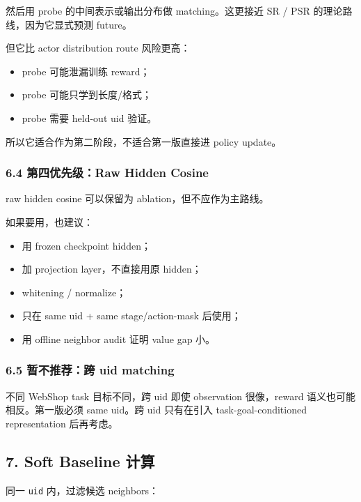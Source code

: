 \documentclass[
  10pt,
]{ctexart}
\providecommand{\tightlist}{%
  \setlength{\itemsep}{0pt}\setlength{\parskip}{0pt}}
\begin{document}
然后用 probe 的中间表示或输出分布做 matching。这更接近 SR / PSR
的理论路线，因为它显式预测 future。

但它比 actor distribution route 风险更高：

\begin{itemize}
\tightlist
\item
  probe 可能泄漏训练 reward；
\item
  probe 可能只学到长度/格式；
\item
  probe 需要 held-out uid 验证。
\end{itemize}

所以它适合作为第二阶段，不适合第一版直接进 policy update。

\subsubsection{6.4 第四优先级：Raw Hidden
Cosine}\label{ux7b2cux56dbux4f18ux5148ux7ea7raw-hidden-cosine}

raw hidden cosine 可以保留为 ablation，但不应作为主路线。

如果要用，也建议：

\begin{itemize}
\tightlist
\item
  用 frozen checkpoint hidden；
\item
  加 projection layer，不直接用原 hidden；
\item
  whitening / normalize；
\item
  只在 same uid + same stage/action-mask 后使用；
\item
  用 offline neighbor audit 证明 value gap 小。
\end{itemize}

\subsubsection{6.5 暂不推荐：跨 uid
matching}\label{ux6682ux4e0dux63a8ux8350ux8de8-uid-matching}

不同 WebShop task 目标不同，跨 uid 即使 observation 很像，reward
语义也可能相反。第一版必须 same uid。跨 uid 只有在引入
task-goal-conditioned representation 后再考虑。

\subsection{7. Soft Baseline 计算}\label{soft-baseline-ux8ba1ux7b97}

同一 \texttt{uid} 内，过滤候选 neighbors：
\end{document}

